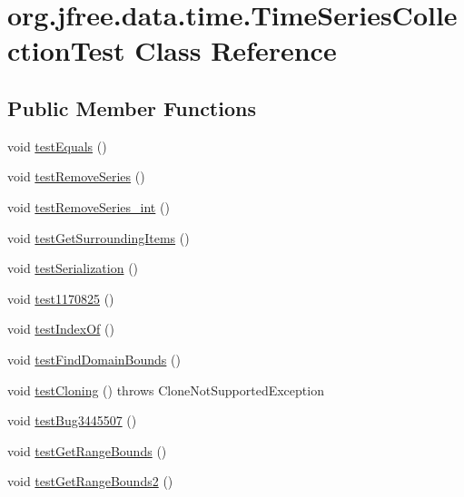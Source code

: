 \hypertarget{classorg_1_1jfree_1_1data_1_1time_1_1_time_series_collection_test}{}\section{org.\+jfree.\+data.\+time.\+Time\+Series\+Collection\+Test Class Reference}
\label{classorg_1_1jfree_1_1data_1_1time_1_1_time_series_collection_test}
\subsection*{Public Member Functions}
\begin{DoxyCompactItemize}
\item 
void \mbox{\hyperlink{classorg_1_1jfree_1_1data_1_1time_1_1_time_series_collection_test_a0386abcc727da7afeea3b9fbff006bba}{test\+Equals}} ()
\item 
void \mbox{\hyperlink{classorg_1_1jfree_1_1data_1_1time_1_1_time_series_collection_test_a83a92b88444799463c58875c4cca2e87}{test\+Remove\+Series}} ()
\item 
void \mbox{\hyperlink{classorg_1_1jfree_1_1data_1_1time_1_1_time_series_collection_test_a1d41d742134273888fa275ba2cbbf32c}{test\+Remove\+Series\+\_\+int}} ()
\item 
void \mbox{\hyperlink{classorg_1_1jfree_1_1data_1_1time_1_1_time_series_collection_test_a8680d2337c60260c23edb265fc74358f}{test\+Get\+Surrounding\+Items}} ()
\item 
void \mbox{\hyperlink{classorg_1_1jfree_1_1data_1_1time_1_1_time_series_collection_test_abc055d0b4ccdf3f42058e398abaebd1c}{test\+Serialization}} ()
\item 
void \mbox{\hyperlink{classorg_1_1jfree_1_1data_1_1time_1_1_time_series_collection_test_af937ba957ad55a5b04e2226fca55387c}{test1170825}} ()
\item 
void \mbox{\hyperlink{classorg_1_1jfree_1_1data_1_1time_1_1_time_series_collection_test_a3527a5ad9b7e68a04dd5c9dc3da06d63}{test\+Index\+Of}} ()
\item 
void \mbox{\hyperlink{classorg_1_1jfree_1_1data_1_1time_1_1_time_series_collection_test_a8fdb916133ab96285e2902b08419c21a}{test\+Find\+Domain\+Bounds}} ()
\item 
void \mbox{\hyperlink{classorg_1_1jfree_1_1data_1_1time_1_1_time_series_collection_test_ad11306309bb6def12659ad3350c6d66d}{test\+Cloning}} ()  throws Clone\+Not\+Supported\+Exception 
\item 
void \mbox{\hyperlink{classorg_1_1jfree_1_1data_1_1time_1_1_time_series_collection_test_ade83fedb40c38e677d5a92970cb9eb5d}{test\+Bug3445507}} ()
\item 
void \mbox{\hyperlink{classorg_1_1jfree_1_1data_1_1time_1_1_time_series_collection_test_abc10e4c403c0d2c72c602680a79adb28}{test\+Get\+Range\+Bounds}} ()
\item 
void \mbox{\hyperlink{classorg_1_1jfree_1_1data_1_1time_1_1_time_series_collection_test_adeaf1f09cf70b5f1ca4fdd52c24c792c}{test\+Get\+Range\+Bounds2}} ()
\end{DoxyCompactItemize}


